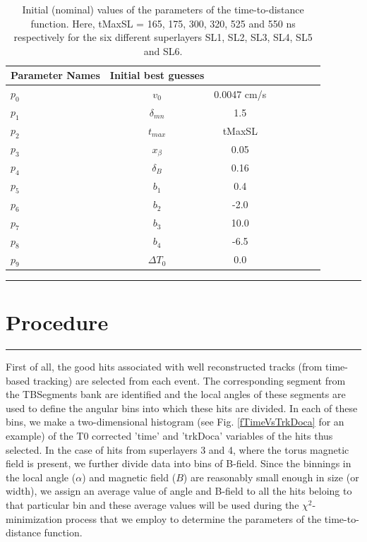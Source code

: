 \documentclass[12pt]{article}
\begin{document}
\begin{table}[H]
\centering
\begin{tabular}{l*{6}{c}r}

Parameter   Names       & Initial best guesses \\
\hline
  $p_0$    &  $v_0$                   & 0.0047 cm/s   \\
  $p_1$    & $\delta_{mn}$            & 1.5   \\
  $p_2$    & $t_{max}$            & tMaxSL    \\
  $p_3$   & $x_{\beta}$            & 0.05  \\ 
  $p_4$    & $\delta_B$    & 0.16  \\
  $p_5$    & $b_1$                     & 0.4  \\
  $p_6$    & $b_2$                     & -2.0 \\
  $p_7$    & $b_3$                     & 10.0 \\
  $p_8$    & $b_4$                     & -6.5  \\
  $p_9$    & $\Delta T_0$             & 0.0 \\
\hline
\end{tabular}
\caption{Initial (nominal) values of the parameters of the time-to-distance function. Here, tMaxSL = 165, 175, 300, 320, 525 and 550 ns respectively for the six different superlayers SL1, SL2, SL3, SL4, SL5 and SL6.}  
\label{tParInitialValues}
\end{table}



{\color{black} \rule{\linewidth}{0.75mm} }
\section{Procedure}
\label{lProcedure}
{\color{black} \rule{\linewidth}{0.75mm} }

First of all, the good hits associated with well reconstructed tracks (from time-based tracking) are selected from each event. The corresponding segment from the TBSegments bank are identified and the local angles of these segments are used to define the 
angular bins into which these hits are divided. In each of these bins, we make a two-dimensional histogram (see Fig. \ref{fTimeVsTrkDoca} for an example) of the T0 corrected 'time' and 'trkDoca' variables of the hits thus selected. In the case of hits from superlayers 3 and 4, where the torus magnetic field is present, we further divide data into bins of B-field. Since the binnings in the local angle ($\alpha$) and magnetic field ($B$) are reasonably small enough in size (or width), we assign an average value of angle and B-field to all the hits beloing to that particular bin and these average values will be used during the $\chi^2$-minimization process that we employ to determine the parameters of the time-to-distance function.
\end{document}
